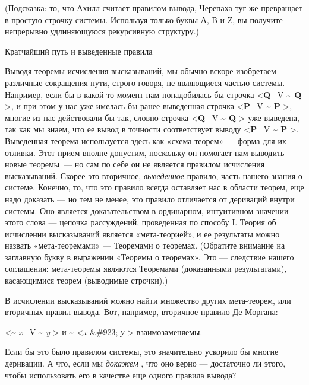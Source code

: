 (Подсказка: то, что Ахилл считает правилом вывода, Черепаха туг же превращает в простую строчку системы. Используя только буквы А, В и Z, вы получите непрерывно удлиняющуюся рекурсивную структуру.)

Кратчайший путь и выведенные правила

Выводя теоремы исчисления высказываний, мы обычно вскоре изобретаем различные сокращения пути, строго говоря, не являющиеся частью системы. Например, если бы в какой-то момент нам понадобилась бы строчка \textless{}\textbf{Q} ~V \textbf{\textasciitilde{} Q} \textgreater, и при этом у нас уже имелась бы ранее выведенная строчка \textless{}\textbf{P} ~V \textbf{\textasciitilde{} P} \textgreater, многие из нас действовали бы так, словно строчка \textless{}\textbf{Q} ~V \textbf{\textasciitilde{} Q} \textgreater{} уже выведена, так как мы знаем, что ее вывод в точности соответствует выводу \textless{}\textbf{P} ~V \textbf{\textasciitilde{} P} \textgreater. Выведенная теорема используется здесь как «схема теорем» --- форма для их отливки. Этот прием вполне допустим, поскольку он помогает нам выводить новые теоремы~--- но сам по себе он не является правилом исчисления высказываний. Скорее это вторичное, \emph{выведенное} правило, часть нашего знания о системе. Конечно, то, что это правило всегда оставляет нас в области теорем, еще надо доказать --- но тем не менее, это правило отличается от дериваций внутри системы. Оно является доказательством в ординарном, интуитивном значении этого слова --- цепочка рассуждений, проведенная по способу I. Теория об исчислении высказываний является «мета-теорией», и ее результаты можно назвать «мета-теоремами» --- Теоремами о теоремах. (Обратите внимание на заглавную букву в выражении «Теоремы о теоремах». Это --- следствие нашего соглашения: мета-теоремы являются Теоремами (доказанными результатами), касающимися теорем (выводимые строчки).)

В исчислении высказываний можно найти множество других мета-теорем, или вторичных правил вывода. Вот, например, вторичное правило Де Моргана:

\textless{}\textbf{\textasciitilde{}} \emph{x~} V \textbf{\textasciitilde{}} \emph{y} \textgreater{} и \textbf{\textasciitilde{}} \textless{}\emph{x} \&\#923; \emph{у} \textgreater{} взаимозаменяемы.

Если бы это было правилом системы, это значительно ускорило бы многие деривации. А что, если мы \emph{докажем} , что оно верно --- достаточно ли этого, чтобы использовать его в качестве еще одного правила вывода?

